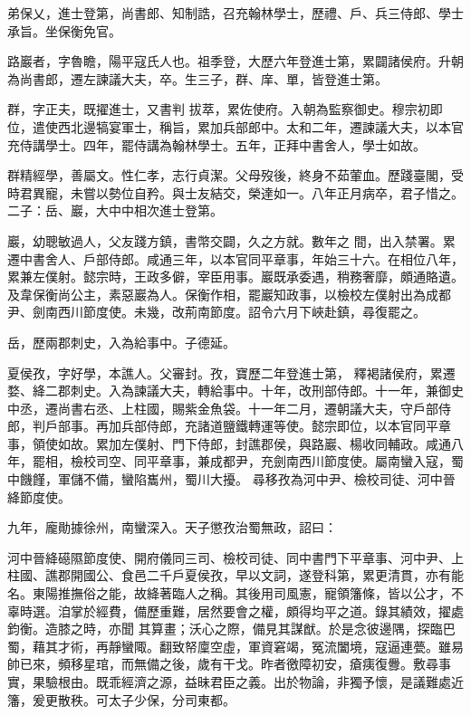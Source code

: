 \begin{pinyinscope}
 弟保乂，進士登第，尚書郎、知制誥，召充翰林學士，歷禮、戶、兵三侍郎、學士承旨。坐保衡免官。



 路巖者，字魯瞻，陽平寇氏人也。祖季登，大歷六年登進士第，累闢諸侯府。升朝為尚書郎，遷左諫議大夫，卒。生三子，群、庠、單，皆登進士第。



 群，字正夫，既擢進士，又書判
 拔萃，累佐使府。入朝為監察御史。穆宗初即位，遣使西北邊犒宴軍士，稱旨，累加兵部郎中。太和二年，遷諫議大夫，以本官充侍講學士。四年，罷侍講為翰林學士。五年，正拜中書舍人，學士如故。



 群精經學，善屬文。性仁孝，志行貞潔。父母歿後，終身不茹葷血。歷踐臺閣，受時君異寵，未嘗以勢位自矜。與士友結交，榮達如一。八年正月病卒，君子惜之。二子：岳、巖，大中中相次進士登第。



 巖，幼聰敏過人，父友踐方鎮，書幣交闢，久之方就。數年之
 間，出入禁署。累遷中書舍人、戶部侍郎。咸通三年，以本官同平章事，年始三十六。在相位八年，累兼左僕射。懿宗時，王政多僻，宰臣用事。巖既承委遇，稍務奢靡，頗通賂遺。及韋保衡尚公主，素惡巖為人。保衡作相，罷巖知政事，以檢校左僕射出為成都尹、劍南西川節度使。未幾，改荊南節度。詔令六月下峽赴鎮，尋復罷之。



 岳，歷兩郡刺史，入為給事中。子德延。



 夏侯孜，字好學，本譙人。父審封。孜，寶歷二年登進士第，
 釋褐諸侯府，累遷婺、絳二郡刺史。入為諫議大夫，轉給事中。十年，改刑部侍郎。十一年，兼御史中丞，遷尚書右丞、上柱國，賜紫金魚袋。十一年二月，遷朝議大夫，守戶部侍郎，判戶部事。再加兵部侍郎，充諸道鹽鐵轉運等使。懿宗即位，以本官同平章事，領使如故。累加左僕射、門下侍郎，封譙郡侯，與路巖、楊收同輔政。咸通八年，罷相，檢校司空、同平章事，兼成都尹，充劍南西川節度使。屬南蠻入寇，蜀中饑饉，軍儲不備，蠻陷巂州，蜀川大擾。
 尋移孜為河中尹、檢校司徒、河中晉絳節度使。



 九年，龐勛據徐州，南蠻深入。天子懲孜治蜀無政，詔曰：



 河中晉絳礠隰節度使、開府儀同三司、檢校司徒、同中書門下平章事、河中尹、上柱國、譙郡開國公、食邑二千戶夏侯孜，早以文詞，遂登科第，累更清貫，亦有能名。東陽推撫俗之能，故絳著臨人之稱。其後用司風憲，寵領籓條，皆以公才，不辜時選。洎掌於經費，備歷重難，居然要會之權，頗得均平之道。錄其績效，擢處鈞衡。造膝之時，亦聞
 其算畫；沃心之際，備見其謀猷。於是念彼邊隅，探臨巴蜀，藉其才術，再靜蠻陬。翻致帑廩空虛，軍資窘竭，冤流闔境，寇逼連甍。雖易帥已來，頻移星琯，而無備之後，歲有干戈。昨者徼障初安，瘡痍復釁。敷尋事實，果驗根由。既乖經濟之源，益昧君臣之義。出於物論，非獨予懷，是議難處近籓，爰更散秩。可太子少保，分司東都。




\end{pinyinscope}

